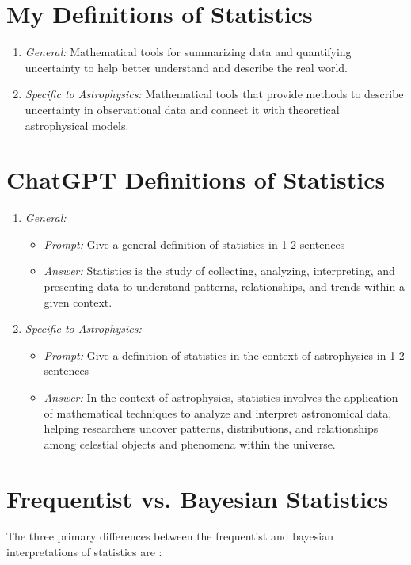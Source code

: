 \documentclass[12pt]{article}
\begin{document}
\thispagestyle{hdr}

\section*{My Definitions of Statistics}
\begin{enumerate}
\item \textit{General:} Mathematical tools for summarizing data and quantifying uncertainty to help better understand and describe the real world.
\item \textit{Specific to Astrophysics:} Mathematical tools that provide methods to describe uncertainty in observational data and connect it with theoretical astrophysical models.
\end{enumerate}

\section*{ChatGPT Definitions of Statistics}
\begin{enumerate}
\item \textit{General:}
\begin{itemize}
\item \textit{Prompt:} Give a general definition of statistics in 1-2 sentences
\item \textit{Answer:} Statistics is the study of collecting, analyzing, interpreting, and presenting data to understand patterns, relationships, and trends within a given context.
\end{itemize}
\item \textit{Specific to Astrophysics:}
\begin{itemize}
\item \textit{Prompt:} Give a definition of statistics in the context of astrophysics in 1-2 sentences
\item \textit{Answer:} In the context of astrophysics, statistics involves the application of mathematical techniques to analyze and interpret astronomical data, helping researchers uncover patterns, distributions, and relationships among celestial objects and phenomena within the universe.
\end{itemize}
\end{enumerate}

\section*{Frequentist vs. Bayesian Statistics}
The three primary differences between the frequentist and bayesian interpretations of statistics are \cite{bayes_vs_frequentist}:
\end{document}
